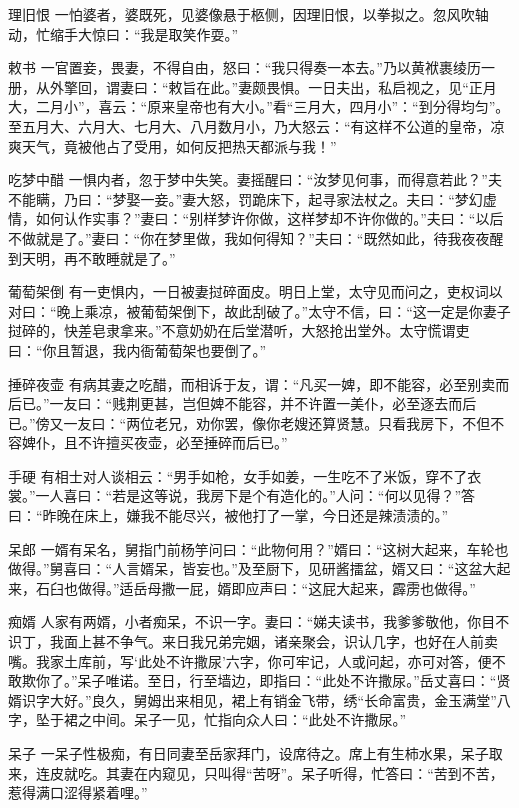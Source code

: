 \documentclass[12pt,UTF8]{ctexbook}
\begin{document}
理旧恨
一怕婆者，婆既死，见婆像悬于柩侧，因理旧恨，以拳拟之。忽风吹轴动，忙缩手大惊曰：“我是取笑作耍。”

敕书
一官置妾，畏妻，不得自由，怒曰：“我只得奏一本去。”乃以黄袱裹绫历一册，从外擎回，谓妻曰：“敕旨在此。”妻颇畏惧。一日夫出，私启视之，见“正月大，二月小”，喜云：“原来皇帝也有大小。”看“三月大，四月小”：“到分得均匀”。至五月大、六月大、七月大、八月数月小，乃大怒云：“有这样不公道的皇帝，凉爽天气，竟被他占了受用，如何反把热天都派与我！”

吃梦中醋
一惧内者，忽于梦中失笑。妻摇醒曰：“汝梦见何事，而得意若此？”夫不能瞒，乃曰：“梦娶一妾。”妻大怒，罚跪床下，起寻家法杖之。夫曰：“梦幻虚情，如何认作实事？”妻曰：“别样梦许你做，这样梦却不许你做的。”夫曰：“以后不做就是了。”妻曰：“你在梦里做，我如何得知？”夫曰：“既然如此，待我夜夜醒到天明，再不敢睡就是了。”

葡萄架倒
有一吏惧内，一日被妻挝碎面皮。明日上堂，太守见而问之，吏权词以对曰：“晚上乘凉，被葡萄架倒下，故此刮破了。”太守不信，曰：“这一定是你妻子挝碎的，快差皂隶拿来。”不意奶奶在后堂潜听，大怒抢出堂外。太守慌谓吏曰：“你且暂退，我内衙葡萄架也要倒了。”

捶碎夜壶
有病其妻之吃醋，而相诉于友，谓：“凡买一婢，即不能容，必至别卖而后已。”一友曰：“贱荆更甚，岂但婢不能容，并不许置一美仆，必至逐去而后已。”傍又一友曰：“两位老兄，劝你罢，像你老嫂还算贤慧。只看我房下，不但不容婢仆，且不许擅买夜壶，必至捶碎而后已。”

手硬
有相士对人谈相云：“男手如枪，女手如姜，一生吃不了米饭，穿不了衣裳。”一人喜曰：“若是这等说，我房下是个有造化的。”人问：“何以见得？”答曰：“昨晚在床上，嫌我不能尽兴，被他打了一掌，今日还是辣渍渍的。”

呆郎
一婿有呆名，舅指门前杨竽问曰：“此物何用？”婿曰：“这树大起来，车轮也做得。”舅喜曰：“人言婿呆，皆妄也。”及至厨下，见研酱擂盆，婿又曰：“这盆大起来，石臼也做得。”适岳母撒一屁，婿即应声曰：“这屁大起来，霹雳也做得。”

痴婿
人家有两婿，小者痴呆，不识一字。妻曰：“娣夫读书，我爹爹敬他，你目不识丁，我面上甚不争气。来日我兄弟完姻，诸亲聚会，识认几字，也好在人前卖嘴。我家土库前，写‘此处不许撒尿’六字，你可牢记，人或问起，亦可对答，便不敢欺你了。”呆子唯诺。至日，行至墙边，即指曰：“此处不许撒尿。”岳丈喜曰：“贤婿识字大好。”良久，舅姆出来相见，裙上有销金飞带，绣“长命富贵，金玉满堂”八字，坠于裙之中间。呆子一见，忙指向众人曰：“此处不许撒尿。”

呆子
一呆子性极痴，有日同妻至岳家拜门，设席待之。席上有生柿水果，呆子取来，连皮就吃。其妻在内窥见，只叫得“苦呀”。呆子听得，忙答曰：“苦到不苦，惹得满口涩得紧着哩。”
\end{document}
